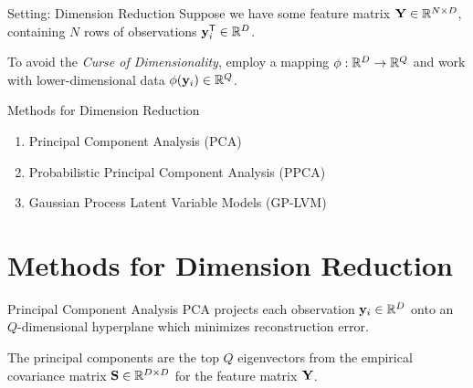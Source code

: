 \documentclass[dvipsnames]{beamer}
\begin{document}
\begin{frame}{Setting: Dimension Reduction}
    Suppose we have some feature matrix $\mathbf{Y} \in \mathbb{R}^{N \times D}$, containing $N$ rows of observations $\mathbf{y}_{i}^{\scriptstyle{\mathsf{T}}} \in \mathbb{R}^{D}$.

    \bigskip

    To avoid the \emph{Curse of Dimensionality}, employ a mapping $\phi: \mathbb{R}^{D} \to \mathbb{R}^{Q}$ and work with lower-dimensional data $\phi(\mathbf{y}_{i}) \in \mathbb{R}^{Q}$.

    \bigskip

    \begin{block}{Methods for Dimension Reduction}
        \begin{enumerate}[label=\arabic*:]
            \item Principal Component Analysis (PCA)
            \item Probabilistic Principal Component Analysis (PPCA)
            \item Gaussian Process Latent Variable Models (GP-LVM)
        \end{enumerate}
    \end{block}
\end{frame}



\section{Methods for Dimension Reduction}

\begin{frame}{Principal Component Analysis}
    PCA projects each observation $\mathbf{y}_{i} \in \mathbb{R}^{D}$ onto an $Q$-dimensional hyperplane which minimizes reconstruction error.

    \bigskip

    The principal components are the top $Q$ eigenvectors from the empirical covariance matrix ${\mathbf{S}} \in \mathbb{R}^{D \times D}$ for the feature matrix $\mathbf{Y}$. 
\end{frame}
\end{document}
